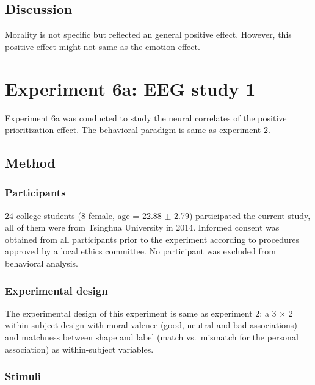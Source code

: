 \documentclass[
  english,
  man]{apa6}
\begin{document}
\hypertarget{discussion-5}{%
\subsection{Discussion}\label{discussion-5}}

Morality is not specific but reflected an general positive effect. However, this positive effect might not same as the emotion effect.

\hypertarget{experiment-6a-eeg-study-1}{%
\section{Experiment 6a: EEG study 1}\label{experiment-6a-eeg-study-1}}

Experiment 6a was conducted to study the neural correlates of the positive prioritization effect. The behavioral paradigm is same as experiment 2.

\hypertarget{method-7}{%
\subsection{Method}\label{method-7}}

\hypertarget{participants-9}{%
\subsubsection{Participants}\label{participants-9}}

24 college students (8 female, age = 22.88 \(\pm\) 2.79) participated the current study, all of them were from Tsinghua University in 2014. Informed consent was obtained from all participants prior to the experiment according to procedures approved by a local ethics committee. No participant was excluded from behavioral analysis.

\hypertarget{experimental-design-3}{%
\subsubsection{Experimental design}\label{experimental-design-3}}

The experimental design of this experiment is same as experiment 2: a 3 × 2 within-subject design with moral valence (good, neutral and bad associations) and matchness between shape and label (match vs.~mismatch for the personal association) as within-subject variables.

\hypertarget{stimuli-4}{%
\subsubsection{Stimuli}\label{stimuli-4}}
\end{document}
